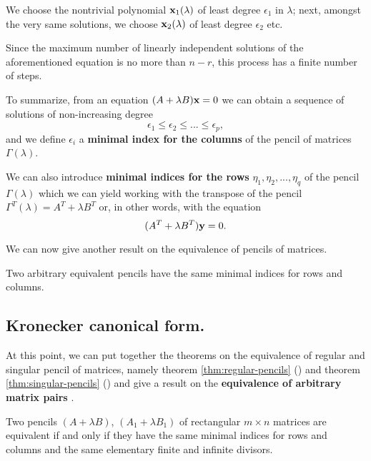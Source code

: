 We choose the nontrivial polynomial \(\vb{x}_{1}(\lambda)\) of least degree \(\epsilon_{1}\) in \(\lambda\); next,
amongst the very same solutions, we choose \(\vb{x}_{2}(\lambda)\) of least degree \(\epsilon_{2}\) etc.

Since the maximum number of linearly independent solutions of the aforementioned equation
is no more than \(n - r\), this process has a finite number of steps.

To summarize, from an equation \((A + \lambda B)\vb{x} = 0\) we can obtain a sequence of solutions of non-increasing degree
\[
    \epsilon_{1} \leq \epsilon_{2} \leq ... \leq \epsilon_{p},
\]
and we define \(\epsilon_{i}\) a \textbf{minimal index for the columns} \cite[p. 38]{gantmacher} of the pencil of matrices
\(\Gamma(\lambda)\).

We can also introduce \textbf{minimal indices for the rows} \cite[p. 38]{gantmacher} \(\eta_{1}, \eta_{2}, ..., \eta_{q}\)
of the pencil \(\Gamma(\lambda)\) which we can yield working with the transpose of the pencil
\(\Gamma^T(\lambda) = A^T + \lambda B^T\) or, in other words, with the equation
\[
    (A^T + \lambda B^T)\vb{y} = 0.
\]

We can now give another result on the equivalence of pencils of matrices.

\begin{theorem} \cite[p. 39]{gantmacher} \label{thm:singular-pencils}
    Two arbitrary equivalent pencils have the same minimal indices for rows and columns.
\end{theorem}

\subsection*{Kronecker canonical form.}
At this point, we can put together the theorems on the equivalence of regular and singular pencil of matrices, namely
theorem \ref{thm:regular-pencils} () and
theorem \ref{thm:singular-pencils} () and give a result on the \textbf{equivalence of
arbitrary matrix pairs} \cite{kronecker1890}.
\begin{theorem}[Kronecker] \cite[p. 40, Theorem 5]{gantmacher} \label{thm:kronecker}
    Two pencils \((A + \lambda B)\), \((A_{1} + \lambda B_{1})\) of rectangular \(m \times n\) matrices
    are equivalent if and only if they have the same minimal indices for rows and columns and the same elementary finite and
    infinite divisors.
\end{theorem}

